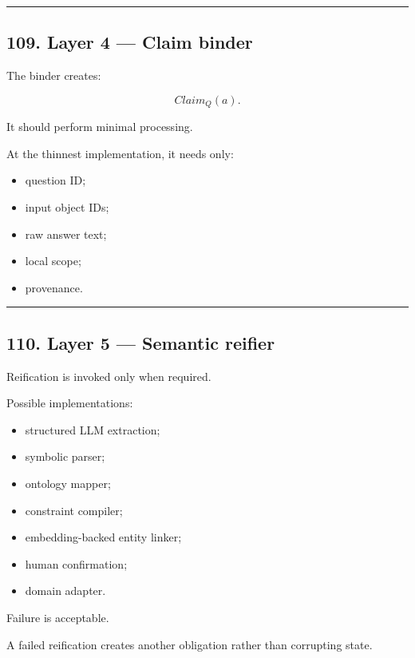 \documentclass[
]{article}
\providecommand{\tightlist}{%
  \setlength{\itemsep}{0pt}\setlength{\parskip}{0pt}}
\begin{document}
\begin{center}\rule{0.5\linewidth}{0.5pt}\end{center}

\subsection{109. Layer 4 --- Claim binder}\label{layer-4-claim-binder}

The binder creates:

\[
Claim_Q(a).
\]

It should perform minimal processing.

At the thinnest implementation, it needs only:

\begin{itemize}
\tightlist
\item
  question ID;
\item
  input object IDs;
\item
  raw answer text;
\item
  local scope;
\item
  provenance.
\end{itemize}

\begin{center}\rule{0.5\linewidth}{0.5pt}\end{center}

\subsection{110. Layer 5 --- Semantic
reifier}\label{layer-5-semantic-reifier}

Reification is invoked only when required.

Possible implementations:

\begin{itemize}
\tightlist
\item
  structured LLM extraction;
\item
  symbolic parser;
\item
  ontology mapper;
\item
  constraint compiler;
\item
  embedding-backed entity linker;
\item
  human confirmation;
\item
  domain adapter.
\end{itemize}

Failure is acceptable.

A failed reification creates another obligation rather than corrupting
state.
\end{document}
